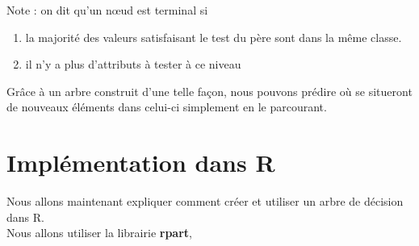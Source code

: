 \documentclass[compress]{beamer}
\begin{document}
\begin{frame}
Note : on dit qu'un nœud est terminal si 
\begin{enumerate}
\item la majorité des valeurs satisfaisant le test du père sont dans la même classe.
\item il n'y a plus d'attributs à tester à ce niveau
\end{enumerate}

Grâce à un arbre construit d'une telle façon, nous pouvons prédire où se situeront de nouveaux éléments dans celui-ci simplement en le parcourant.
\end{frame}

\section{Implémentation dans R}

\begin{frame}
Nous allons maintenant expliquer comment créer et utiliser un arbre de décision dans R.\\

Nous allons utiliser la librairie \textbf{rpart}, 
\end{frame}
\end{document}
